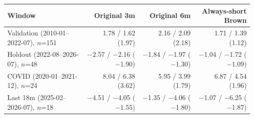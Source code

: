 \begin{tabular}{lrrr}
\toprule
Window & Original 3m & Original 6m & Always-short Brown \\
\midrule
Validation (2010-01--2022-07), $n$=151 & 1.78 / 1.62 (1.97) & 2.16 / 2.09 (2.18) & 1.71 / 1.39 (1.12) \\
Holdout (2022-08--2026-07), $n$=48 & $-$2.57 / $-$2.16 ($-$1.90) & $-$1.84 / $-$1.97 ($-$1.30) & $-$1.04 / $-$1.72 ($-$1.09) \\
COVID (2020-01--2021-12), $n$=24 & 8.04 / 6.38 (3.62) & 5.95 / 3.99 (1.79) & 6.87 / 4.54 (1.96) \\
Last 18m (2025-02--2026-07), $n$=18 & $-$4.51 / $-$4.05 ($-$1.55) & $-$1.35 / $-$4.06 ($-$1.80) & $-$1.07 / $-$6.25 ($-$1.87) \\
\bottomrule
\end{tabular}
